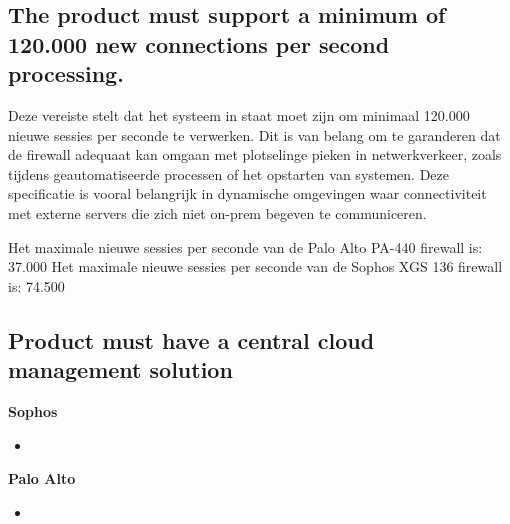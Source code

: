 \subsection{The product must support a minimum of 120.000 new connections per second processing.}
Deze vereiste stelt dat het systeem in staat moet zijn om minimaal 120.000 nieuwe sessies per seconde te verwerken. Dit is van belang om te garanderen dat de firewall adequaat kan omgaan met plotselinge pieken in netwerkverkeer, zoals tijdens geautomatiseerde processen of het opstarten van systemen. Deze specificatie is vooral belangrijk in dynamische omgevingen waar connectiviteit met externe servers die zich niet on-prem begeven te communiceren.

Het maximale nieuwe sessies per seconde van de Palo Alto PA-440 firewall is: 37.000 \newline
Het maximale nieuwe sessies per seconde van de Sophos XGS 136 firewall is: 74.500

\begin{table}[h!]
    \centering
    \caption{Vergelijking van maximale gelijktijdige sessies en nieuwe verbindingen per seconde voor PA-440 en XGS 136 firewalls.}
\end{table}


\subsection{Product must have a central cloud management solution}


\textbf{Sophos}
\begin{itemize}[label=\textbullet]
    \item 
\end{itemize}

\textbf{Palo Alto}
\begin{itemize}[label=\textbullet]
    \item 
\end{itemize}



